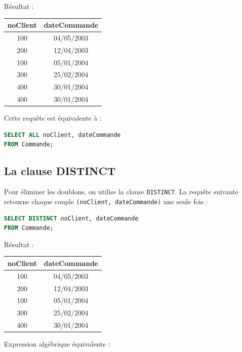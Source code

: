 Résultat :

\begin{tabular}{|c|c|}
    \hline
    \textbf{noClient} & \textbf{dateCommande}  \\
    \hline
    100 & 04/05/2003 \\
200 & 12/04/2003 \\
100 & 05/01/2004 \\
300 & 25/02/2004 \\
400 & 30/01/2004 \\
400 & 30/01/2004 \\
    \hline
\end{tabular}

Cette requête est équivalente à :

\begin{sqlcodebox}
\begin{lstlisting}[language=SQL]
SELECT ALL noClient, dateCommande
FROM Commande;
\end{lstlisting}
\end{sqlcodebox}

\subsection{La clause DISTINCT}

Pour éliminer les doublons, on utilise la clause \texttt{DISTINCT}.  
La requête suivante retourne chaque couple \texttt{(noClient, dateCommande)} une seule fois :

\begin{sqlcodebox}
\begin{lstlisting}[language=SQL]
SELECT DISTINCT noClient, dateCommande
FROM Commande;
\end{lstlisting}
\end{sqlcodebox}

Résultat :

\begin{tabular}{|c|c|}
    \hline
    \textbf{noClient} & \textbf{dateCommande}  \\
    \hline
    100 & 04/05/2003 \\
200 & 12/04/2003 \\
100 & 05/01/2004 \\
300 & 25/02/2004 \\
400 & 30/01/2004 \\
    \hline
\end{tabular}

Expression algébrique équivalente :

